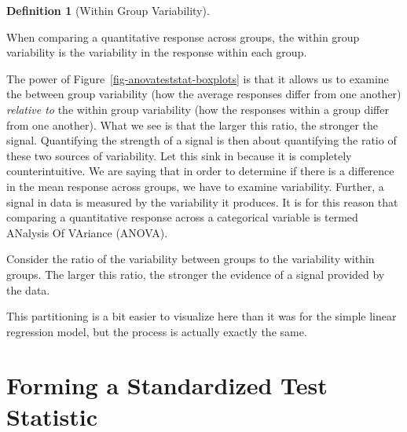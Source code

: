\documentclass[
  letterpaper,
  DIV=11,
  numbers=noendperiod]{scrreprt}
\theoremstyle{plain}
\theoremstyle{definition}
\theoremstyle{definition}
\newtheorem{definition}{Definition}[chapter]
\theoremstyle{remark}
\begin{document}
\begin{definition}[Within Group
Variability]\protect\hypertarget{def-within-group-variability}{}\label{def-within-group-variability}

When comparing a quantitative response across groups, the within group
variability is the variability in the response within each group.

\end{definition}

The power of Figure~\ref{fig-anovateststat-boxplots} is that it allows
us to examine the between group variability (how the average responses
differ from one another) \emph{relative to} the within group variability
(how the responses within a group differ from one another). What we see
is that the larger this ratio, the stronger the signal. Quantifying the
strength of a signal is then about quantifying the ratio of these two
sources of variability. Let this sink in because it is completely
counterintuitive. We are saying that in order to determine if there is a
difference in the mean response across groups, we have to examine
variability. Further, a signal in data is measured by the variability it
produces. It is for this reason that comparing a quantitative response
across a categorical variable is termed ANalysis Of VAriance (ANOVA).

\begin{tcolorbox}[enhanced jigsaw, breakable, titlerule=0mm, colframe=quarto-callout-tip-color-frame, bottomtitle=1mm, opacityback=0, rightrule=.15mm, toptitle=1mm, arc=.35mm, bottomrule=.15mm, left=2mm, title=\textcolor{quarto-callout-tip-color}{\faLightbulb}\hspace{0.5em}{Big Idea}, leftrule=.75mm, coltitle=black, toprule=.15mm, colbacktitle=quarto-callout-tip-color!10!white, colback=white, opacitybacktitle=0.6]

Consider the ratio of the variability between groups to the variability
within groups. The larger this ratio, the stronger the evidence of a
signal provided by the data.

\end{tcolorbox}

This partitioning is a bit easier to visualize here than it was for the
simple linear regression model, but the process is actually exactly the
same.

\section{Forming a Standardized Test
Statistic}\label{forming-a-standardized-test-statistic}
\end{document}
